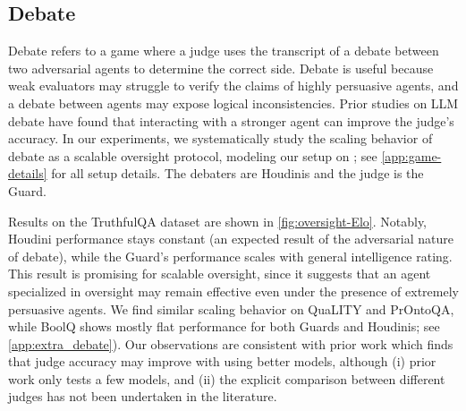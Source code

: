 \documentclass{article}
\begin{document}
\subsection{Debate}
\label{sec:debate}

Debate refers to a game where a judge uses the transcript of a debate between two adversarial agents to determine the correct side. Debate is useful because weak evaluators may struggle to verify the claims of highly persuasive agents, and a debate between agents may expose logical inconsistencies.
Prior studies on LLM debate \citep{kenton2024scalable,khan2024debating} have found that interacting with a stronger agent can improve the judge's accuracy. In our experiments, we systematically study the scaling behavior of debate as a scalable oversight protocol, modeling our setup on \cite{kenton2024scalable}; see \cref{app:game-details} for all setup details. The debaters are Houdinis and the judge is the Guard.


Results on the TruthfulQA dataset are shown in \cref{fig:oversight-Elo}. Notably, Houdini performance stays constant (an expected result of the adversarial nature of debate), while the Guard's performance scales with general intelligence rating. 
This result is promising for scalable oversight, since it suggests that an agent specialized in oversight may remain effective even under the presence of extremely persuasive agents. We find similar scaling behavior on QuaLITY and PrOntoQA,
while BoolQ shows mostly flat performance for both Guards and Houdinis; see \cref{app:extra_debate}).
Our observations are consistent with prior work \citep{khan2024debating,michael2023debate,kenton2024scalable} which finds that judge accuracy may improve with using better models, although (i) prior work only tests a few models, and (ii) the explicit comparison between different judges has not been undertaken in the literature. 
\end{document}
